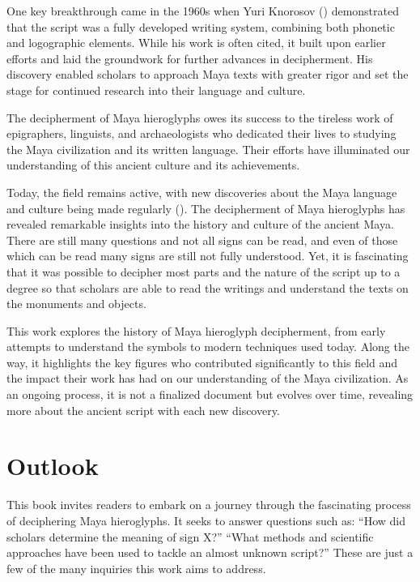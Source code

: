 \documentclass[../main.tex]{subfiles}
\begin{document}
One key breakthrough came in the 1960s when Yuri Knorosov (\cite{knorozov1967}) demonstrated that 
the script was a fully developed writing system, combining both phonetic and logographic elements. 
While his work is often cited, it built upon earlier efforts and laid the groundwork for further 
advances in decipherment. 
His discovery enabled scholars to approach Maya texts with greater rigor and set the 
stage for continued research into their language and culture.

The decipherment of Maya hieroglyphs owes its success to the tireless work of epigraphers, 
linguists, and archaeologists who dedicated their lives to studying the Maya civilization and 
its written language. 
Their efforts have illuminated our understanding of this ancient culture and its achievements.

Today, the field remains active, with new discoveries about the Maya language and culture 
being made regularly (\cite{zender2017}). 
The decipherment of Maya hieroglyphs has revealed remarkable insights 
into the history and culture of the ancient Maya.
There are still many questions and not all signs can be read, and even of those which can be read
many signs are still not fully understood.
Yet, it is fascinating that it was possible to decipher most parts
and the nature of the script up to a degree so that scholars are able to read the writings and 
understand the texts on the monuments and objects.

This work explores the history of Maya hieroglyph decipherment, from early attempts to understand 
the symbols to modern techniques used today. 
Along the way, it highlights the key figures who contributed significantly to this 
field and the impact their work has had on our understanding of the Maya civilization. 
As an ongoing process, it is not a finalized document but evolves over 
time, revealing more about the ancient script with each new discovery.

\section{Outlook}
This book invites readers to embark on a journey through the fascinating process of 
deciphering Maya hieroglyphs. 
It seeks to answer questions such as: 
\enquote{How did scholars determine the meaning of sign X?} 
\enquote{What methods and scientific approaches have been used to tackle an almost unknown script?} 
These are just a few of the many inquiries this work aims to address.
\end{document}
